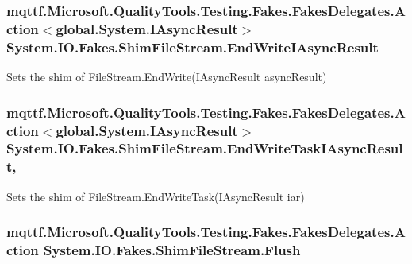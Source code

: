 \hypertarget{class_system_1_1_i_o_1_1_fakes_1_1_shim_file_stream_ab8918ef5d13e873609c17f446adb58ac}{
\subsubsection[{End\-Write\-I\-Async\-Result}]{\setlength{\rightskip}{0pt plus 5cm}mqttf.\-Microsoft.\-Quality\-Tools.\-Testing.\-Fakes.\-Fakes\-Delegates.\-Action$<$global.\-System.\-I\-Async\-Result$>$ System.\-I\-O.\-Fakes.\-Shim\-File\-Stream.\-End\-Write\-I\-Async\-Result\hspace{0.3cm}{\ttfamily [set]}}}\label{class_system_1_1_i_o_1_1_fakes_1_1_shim_file_stream_ab8918ef5d13e873609c17f446adb58ac}


Sets the shim of File\-Stream.\-End\-Write(\-I\-Async\-Result async\-Result)

\hypertarget{class_system_1_1_i_o_1_1_fakes_1_1_shim_file_stream_ad559574e84ee5a7654d880d475e7009e}{
\subsubsection[{End\-Write\-Task\-I\-Async\-Result}]{\setlength{\rightskip}{0pt plus 5cm}mqttf.\-Microsoft.\-Quality\-Tools.\-Testing.\-Fakes.\-Fakes\-Delegates.\-Action$<$global.\-System.\-I\-Async\-Result$>$ System.\-I\-O.\-Fakes.\-Shim\-File\-Stream.\-End\-Write\-Task\-I\-Async\-Result\hspace{0.3cm}{\ttfamily [static]}, {\ttfamily [set]}}}\label{class_system_1_1_i_o_1_1_fakes_1_1_shim_file_stream_ad559574e84ee5a7654d880d475e7009e}


Sets the shim of File\-Stream.\-End\-Write\-Task(\-I\-Async\-Result iar)

\hypertarget{class_system_1_1_i_o_1_1_fakes_1_1_shim_file_stream_af05de78e1efb7ca5ce0be6eb7d1c18db}{
\subsubsection[{Flush}]{\setlength{\rightskip}{0pt plus 5cm}mqttf.\-Microsoft.\-Quality\-Tools.\-Testing.\-Fakes.\-Fakes\-Delegates.\-Action System.\-I\-O.\-Fakes.\-Shim\-File\-Stream.\-Flush\hspace{0.3cm}{\ttfamily [set]}}}\label{class_system_1_1_i_o_1_1_fakes_1_1_shim_file_stream_af05de78e1efb7ca5ce0be6eb7d1c18db}


